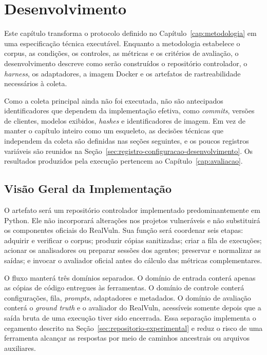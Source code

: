 \chapter{Desenvolvimento}\label{cap:desenvolvimento}

Este capítulo transforma o protocolo definido no Capítulo~\ref{cap:metodologia} em uma especificação técnica executável. Enquanto a metodologia estabelece o corpus, as condições, os controles, as métricas e os critérios de avaliação, o desenvolvimento descreve como serão construídos o repositório controlador, o \textit{harness}, os adaptadores, a imagem Docker e os artefatos de rastreabilidade necessários à coleta.

Como a coleta principal ainda não foi executada, não são antecipados identificadores que dependem da implementação efetiva, como \textit{commits}, versões de clientes, modelos exibidos, \textit{hashes} e identificadores de imagem. Em vez de manter o capítulo inteiro como um esqueleto, as decisões técnicas que independem da coleta são definidas nas seções seguintes, e os poucos registros variáveis são reunidos na Seção~\ref{sec:registro-configuracao-desenvolvimento}. Os resultados produzidos pela execução pertencem ao Capítulo~\ref{cap:avaliacao}.

\section{Visão Geral da Implementação}\label{sec:visao-geral-desenvolvimento}

O artefato será um repositório controlador implementado predominantemente em Python. Ele não incorporará alterações nos projetos vulneráveis e não substituirá os componentes oficiais do RealVuln. Sua função será coordenar seis etapas: adquirir e verificar o corpus; produzir cópias sanitizadas; criar a fila de execuções; acionar os analisadores ou preparar sessões dos agentes; preservar e normalizar as saídas; e invocar o avaliador oficial antes do cálculo das métricas complementares.

O fluxo manterá três domínios separados. O domínio de entrada conterá apenas as cópias de código entregues às ferramentas. O domínio de controle conterá configurações, fila, \textit{prompts}, adaptadores e metadados. O domínio de avaliação conterá o \textit{ground truth} e o avaliador do RealVuln, acessíveis somente depois que a saída bruta de uma execução tiver sido encerrada. Essa separação implementa o cegamento descrito na Seção~\ref{sec:repositorio-experimental} e reduz o risco de uma ferramenta alcançar as respostas por meio de caminhos ancestrais ou arquivos auxiliares.

